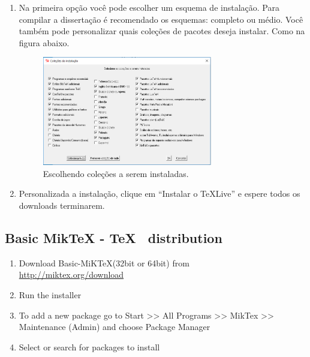\begin{enumerate}
\begin{enumerate}
              \item Na primeira opção você pode escolher um esquema de instalação. Para compilar a dissertação é recomendado os esquemas: completo ou médio. Você também pode personalizar quais coleções de pacotes deseja instalar. Como na figura abaixo.
              \begin{figure}[htbp!]
                \centering
                \includegraphics[width=0.7\textwidth]{Appendix1/Figs/install-tl-02.png}
                \caption[Instação Personalizaa]{Escolhendo coleções a serem instaladas.}
                \label{fig:install-tl-02}
            \end{figure}

            \item Personalizada a instalação, clique em ``Instalar o TeXLive'' e espere todos os downloads terminarem.
	      \end{enumerate}
\end{enumerate}


\subsection*{Basic MikTeX - \TeX~ distribution}
\begin{enumerate}
	\item	Download Basic-MiK\TeX (32bit or 64bit) from\\
	      \href{http://miktex.org/download}{http://miktex.org/download}
	\item	Run the installer
	\item	To add a new package go to Start >> All Programs >> MikTex >> Maintenance (Admin) and choose Package Manager
	\item	Select or search for packages to install
\end{enumerate}

